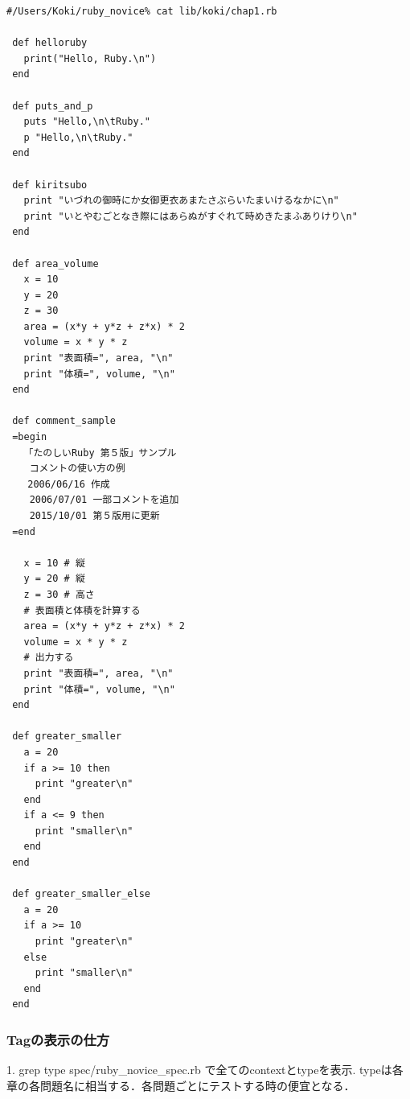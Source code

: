 \begin{lstlisting}[style=customRuby,basicstyle={\scriptsize\ttfamily}]
 #/Users/Koki/ruby_novice% cat lib/koki/chap1.rb
 
 def helloruby     
   print("Hello, Ruby.\n")
 end
 
 def puts_and_p
   puts "Hello,\n\tRuby."
   p "Hello,\n\tRuby."
 end
 
 def kiritsubo
   print "いづれの御時にか女御更衣あまたさぶらいたまいけるなかに\n"
   print "いとやむごとなき際にはあらぬがすぐれて時めきたまふありけり\n"
 end
 
 def area_volume
   x = 10
   y = 20
   z = 30
   area = (x*y + y*z + z*x) * 2
   volume = x * y * z
   print "表面積=", area, "\n"
   print "体積=", volume, "\n"
 end
 
 def comment_sample
 =begin                                                                          
   「たのしいRuby 第５版」サンプル                                               
    コメントの使い方の例                                                         
  　2006/06/16 作成                                                              
    2006/07/01 一部コメントを追加                                                
    2015/10/01 第５版用に更新                                                    
 =end
 
   x = 10 # 縦                                                                   
   y = 20 # 縦                                                                   
   z = 30 # 高さ                                                                 
   # 表面積と体積を計算する                                                      
   area = (x*y + y*z + z*x) * 2
   volume = x * y * z
   # 出力する                                                                    
   print "表面積=", area, "\n"
   print "体積=", volume, "\n"
 end
 
 def greater_smaller
   a = 20
   if a >= 10 then
     print "greater\n"
   end
   if a <= 9 then
     print "smaller\n"
   end
 end
 
 def greater_smaller_else
   a = 20
   if a >= 10
     print "greater\n"
   else
     print "smaller\n"
   end
 end
\end{lstlisting}
\subsubsection{Tagの表示の仕方}

1. grep type spec/ruby\_novice\_spec.rb  で全てのcontextとtypeを表示.
typeは各章の各問題名に相当する．各問題ごとにテストする時の便宜となる．


